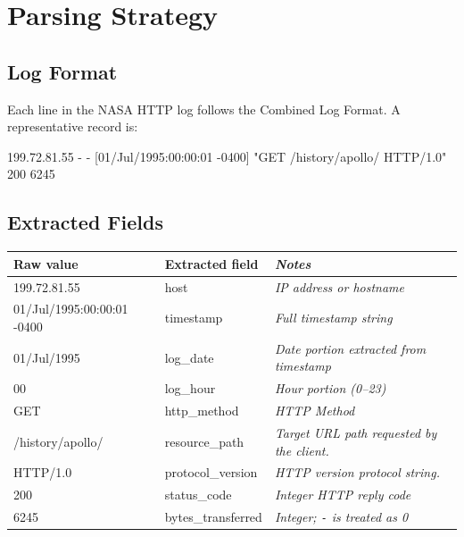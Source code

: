 \documentclass[11pt,a4paper]{article}
\begin{document}
\section{Parsing Strategy}
\label{sec:parsing}

\subsection{Log Format}

Each line in the NASA HTTP log follows the Combined Log Format. A representative record is:

\begin{tcolorbox}[basebox, 
                  colback=DarkGray!90, colframe=DarkGray,
                  fontupper=\ttfamily\footnotesize\color{white}] %
199.72.81.55 - - [01/Jul/1995:00:00:01 -0400] "GET /history/apollo/ HTTP/1.0" 200 6245
\end{tcolorbox}

\subsection{Extracted Fields}
\vspace{4pt}
\begin{center}
\renewcommand{\arraystretch}{1.35}
\begin{tabular}{@{} >{\ttfamily\small}l >{\small}l >{\small\itshape}l @{}}
\toprule
\textnormal{\textbf{Raw value}} & \textbf{Extracted field} & \textbf{Notes} \\
\midrule
199.72.81.55              & host             & IP address or hostname \\
01/Jul/1995:00:00:01 -0400 & timestamp        & Full timestamp string \\
01/Jul/1995               & log\_date        & Date portion extracted from timestamp \\
00                        & log\_hour        & Hour portion (0--23) \\
GET                       & http\_method     & HTTP Method \\
/history/apollo/          & resource\_path   & Target URL path requested by the client. \\
HTTP/1.0                  & protocol\_version & HTTP version protocol string. \\
200                       & status\_code     & Integer HTTP reply code \\
6245                      & bytes\_transferred & Integer; \texttt{-} is treated as 0 \\
\bottomrule
\end{tabular}
\end{center}
\end{document}
